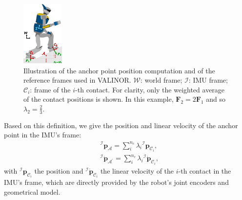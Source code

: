 \documentclass{IJCAS}
\begin{document}
\begin{figure}[!t]
\begin{center}
\includegraphics[width=0.5\columnwidth]{Uploaded/Images/framesAndAnchor.pdf} 
\vskip -0.5pc
\caption{Illustration of the anchor point position computation and of the reference frames used in VALINOR. $\mathcal{W}$: world frame; $\mathcal{I}$: IMU frame; $\mathcal{C}_{i}$: frame of the $i$-th contact. For clarity, only the weighted average of the contact positions is shown. In this example, $\boldsymbol{F}_{2} = 2\boldsymbol{F}_{1}$ and so $\lambda_{2} = \frac{2}{3}$.}\label{fig:framesAndAnchor}
\end{center}
\vskip -1.5pc
\end{figure}

Based on this definition, we give the position and linear velocity of the anchor point in the IMU's frame:
\begin{align} 
&{^{\mathcal{I}}}\boldsymbol{p}_{\mathcal{A}} = \sum^{n_{c}}_{i} \lambda_{i}  {^{\mathcal{I}}} \boldsymbol{p}_{{\mathcal{C}}_{i}}, \label{eq:imuAnchorPos} \\
&{^{\mathcal{I}}} \dot{\boldsymbol{p}}_{\mathcal{A}^{\prime}} = \sum^{n_{c}}_{i} \lambda_{i}  {^{\mathcal{I}}} \dot{\boldsymbol{p}}_{{\mathcal{C}}_{i}}, \label{eq:imuAnchorVel}
\end{align} 
with ${^{\mathcal{I}}} \boldsymbol{p}_{{\mathcal{C}}_{i}}$ the position and ${^{\mathcal{I}}} \dot{\boldsymbol{p}}_{{\mathcal{C}}_{i}}$ the linear velocity of the $i$-th contact in the IMU's frame, which are directly provided by the robot's joint encoders and geometrical model.
\end{document}
